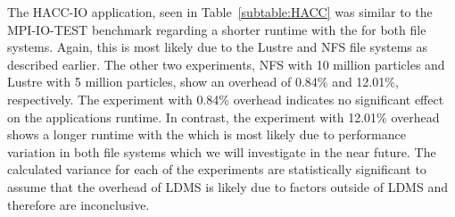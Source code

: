 
The HACC-IO application, seen in Table~\ref{subtable:HACC} was similar to the MPI-IO-TEST benchmark regarding a shorter runtime with the \connector{} for both file systems. Again, this is most likely due to the Lustre and NFS file systems as described earlier. The other two experiments, NFS with 10 million particles and Lustre with 5 million particles, show an overhead of 0.84\% and 12.01\%, respectively. The experiment with 0.84\% overhead indicates no significant effect on the applications runtime. In contrast, the experiment with 12.01\% overhead shows a longer runtime with the \connector{} which is most likely due to performance variation in both file systems which we will investigate in the near future. The calculated variance for each of the experiments are statistically significant to assume that the overhead of LDMS is likely due to factors outside of LDMS and therefore are inconclusive.


